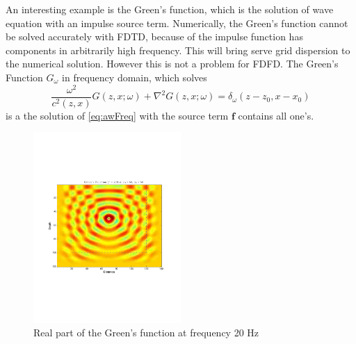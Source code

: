 \documentclass[11pt]{article}
\newcommand{\bff}{\boldsymbol{f}}
\theoremstyle{plain}
\theoremstyle{definition}
\theoremstyle{remark}
\numberwithin{equation}{section}
\begin{document}
An interesting example is the Green's function, which is the solution of wave equation with an impulse source term. Numerically,
the Green's function cannot be solved accurately with FDTD, because of the impulse function has components in arbitrarily high
frequency. This will bring serve grid dispersion to the numerical solution. However this is not a problem for FDFD. The Green's Function 
$G_{\omega}$ in frequency domain, which solves  
  \begin{equation}
  \frac{\omega^2}{c^2(z, x)}G(z, x;\omega) + \nabla^2 G(z, x;\omega) = \delta_{\omega}(z-z_0, x-x_0)
  \end{equation}
  is a the solution of \eqref{eq:awFreq} with the source term $\bff$ contains all one's.
  
\begin{figure}[htbp]
\centering
\includegraphics[width=0.5\textwidth]{Fig/GreensFunction.pdf}
\caption{Real part of the Green's function at frequency 20 Hz} 
\end{figure}
\end{document}
